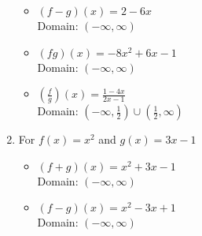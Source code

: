 \begin{enumerate}
\begin{multicols}{2}
\begin{itemize}
      \columnbreak
      
\item $(f-g)(x) = 2-6x$ \\
      Domain:  $(-\infty, \infty)$


\end{itemize}

\end{multicols}

\begin{multicols}{2}

\begin{itemize}

\item $(fg)(x) = -8x^2+6x-1$ \\
      Domain: $(-\infty, \infty)$
      
      \vfill
      
      \columnbreak
      
\item $\left(\frac{f}{g}\right)(x) = \frac{1-4x}{2x-1}$ \\
      Domain:  $\left(-\infty, \frac{1}{2} \right) \cup \left(\frac{1}{2}, \infty \right)$


\end{itemize}

\end{multicols}

\newpage

\item For $f(x) = x^2$ and $g(x) = 3x-1$

\begin{multicols}{2}

\begin{itemize}

\item $(f+g)(x) = x^2+3x-1$ \\
      Domain: $(-\infty, \infty)$
      
      \vfill
      
      \columnbreak
      
\item $(f-g)(x) = x^2-3x+1$ \\
      Domain:  $(-\infty, \infty)$


\end{itemize}

\end{multicols}

\begin{multicols}{2}

\begin{itemize}


\end{itemize}
\end{multicols}
\end{enumerate}
